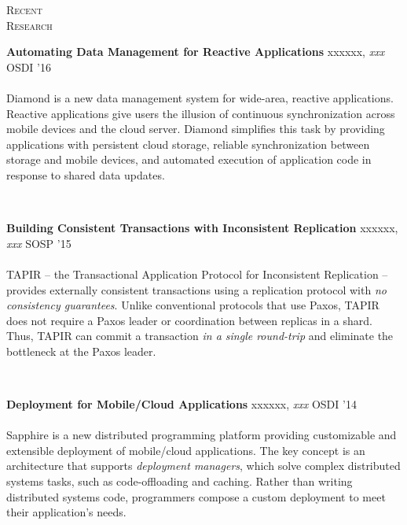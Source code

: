 \documentclass[10pt,times]{report}
\newlength{\sectiongap}
\newlength{\entrygap}
\newlength{\sectioncolwidth}
\newlength{\colgap}
\newlength{\stuffwidth}
\def\ifEqString#1#2{\def\testa{#1}\def\testb{#2}%
  \ifx\testa\testb}
\newenvironment{rtable}{
  \begin{minipage}{\textwidth}
  }{
  \end{minipage}
}
\newenvironment{rentry}[3][xxx]{
  \begin{minipage}[t]{\hsize}
    \textbf{#2}\ifEqString{#1}{xxx}\relax\else, \textit{#1}\fi
    \hspace{\stretch{1}} #3 \\
  }{
    \removelastskip
  \end{minipage}
  \\[\entrygap]  %
}
\newenvironment{rsection}[1]{
  \begin{minipage}[t]{\sectioncolwidth}
    \textsc{#1}
  \end{minipage}
  \hspace{\colgap}
  \begin{minipage}[t]{\stuffwidth}
  }{
    \removelastskip
  \end{minipage}
  \\[\sectiongap]
}
\begin{document}
\begin{rtable}
  \begin{rsection}{Recent\\Research}
    \begin{rentry}{Automating Data Management for Reactive
        Applications}{OSDI '16}
      \vspace{-.5em}\\
      Diamond is a new data management system for wide-area, reactive
      applications. Reactive applications give users the illusion of
      continuous synchronization across mobile devices and the cloud
      server. Diamond simplifies this task by providing applications
      with persistent cloud storage, reliable synchronization between
      storage and mobile devices, and automated execution of
      application code in response to shared data updates.
    \end{rentry}\vspace{.5em}

    \begin{rentry}{Building Consistent Transactions with Inconsistent
        Replication}{SOSP '15}
      \vspace{-.5em}\\
      TAPIR -- the Transactional Application Protocol for Inconsistent
      Replication -- provides externally consistent transactions using a
      replication protocol with \emph{no consistency guarantees}.
      Unlike conventional protocols that use Paxos, TAPIR does not
      require a Paxos leader or coordination between replicas in a
      shard. Thus, TAPIR can commit a transaction \emph{in a single
        round-trip} and eliminate the bottleneck at the Paxos leader.
    \end{rentry}\vspace{.5em}

    \begin{rentry}{Deployment for Mobile/Cloud Applications}{OSDI '14}
      \vspace{-.5em}\\
      Sapphire is a new distributed programming platform providing
      customizable and extensible deployment of mobile/cloud
      applications. The key concept is an architecture that supports
      \emph{deployment managers}, which solve complex distributed
      systems tasks, such as code-offloading and caching. Rather than
      writing distributed systems code, programmers compose a custom
      deployment to meet their application's needs.
    \end{rentry}\vspace{.5em}


\end{rsection}
\end{rtable}
\end{document}
